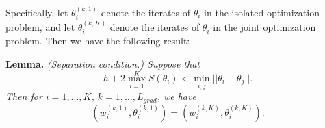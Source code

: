 \documentclass[11pt]{article}
\begin{document}
Specifically, let $\theta_i^{(k, 1)}$ denote the iterates of $\theta_i$ in the isolated optimization problem,
and let $\theta_i^{(k, K)}$ denote the iterates of $\theta_i$ in the joint optimization problem.
Then we have the following result:

\textbf{Lemma.} \emph{
(Separation condition.)
Suppose that
\[
h + 2 \max_{i=1}^K S(\theta_i) < \min_{i, j} ||\theta_i - \theta_j||.
\]
Then for $i = 1,\hdots, K$, $k = 1,\hdots, L_{grad}$, we have
\[
(w_i^{(k, 1)}, \theta_i^{(k, 1)}) = (w_i^{(k, K)}, \theta_i^{(k, K)}).
\]
}
\end{document}
